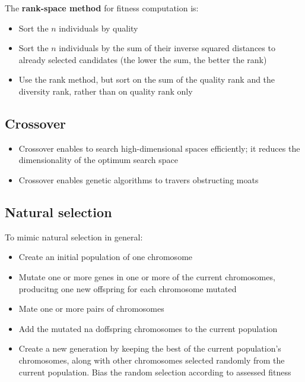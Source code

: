 The \textbf{rank-space method} for fitness computation is:
\begin{itemize}
  \item Sort the $n$ individuals by quality
  \item Sort the $n$ individuals by the sum of their inverse
    squared distances to already selected candidates (the lower the
    sum, the better the rank)
  \item Use the rank method, but sort on the sum of the quality
    rank and the diversity rank, rather than on quality rank only
\end{itemize}

\subsection{Crossover}

\begin{itemize}
  \item Crossover enables to search high-dimensional spaces efficiently; 
it reduces the dimensionality of the optimum search space
  \item Crossover enables genetic algorithms to travers obstructing
    moats
\end{itemize}

\subsection{Natural selection}

To mimic natural selection in general:
\begin{itemize}
  \item Create an initial population of one chromosome
  \item Mutate one or more genes in one or more of the current
    chromosomes, producitng one new offspring for each chromosome
    mutated
  \item Mate one or more pairs of chromosomes
  \item Add the mutated na doffspring chromosomes to the current
    population
  \item Create a new generation by keeping the best of the current
    population's chromosomes, along with other chromosomes selected
    randomly from the current population. Bias the random selection
    according to assessed fitness
\end{itemize}

